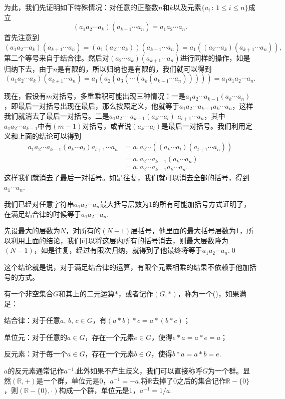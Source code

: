 为此，我们先证明如下特殊情况：对任意的正整数$n$和$k$以及元素$\{a_i\,:\, 1\leq i \leq n\}$成立
\[(a_1a_2\cdots a_{k})(a_{k+1}\cdots a_{n})=a_1a_2\cdots a_n.\]
首先注意到
\[
(a_1a_2\cdots a_{k})(a_{k+1}\cdots a_{n})=(a_1(a_2\cdots a_{k}))(a_{k+1}\cdots a_{n})=a_1((a_2\cdots a_{k})(a_{k+1}\cdots a_{n})),
\]
第二个等号来自于结合律。然后对$(a_2\cdots a_{k})(a_{k+1}\cdots a_{n})$进行同样的操作，如是归纳下去，由于$n$是有限的，所以归纳也是有限的，我们就可以得到
\[
(a_1a_2\cdots a_{k})(a_{k+1}\cdots a_{n})=a_1(a_2(a_3(\cdots (a_{k}(a_{k+1}\cdots a_{n})))))=a_1a_1a_2\cdots a_n.
\]

现在，假设有$m$对括号，多重乘积可能出现三种情况：一是$a_1a_2\cdots a_{k-1}(a_{k}\cdots a_n)$，即最后一对括号出现在最后，那么按照定义，他就等于$a_1a_2\cdots a_{k-1}a_{k}\cdots a_n$，这样我们就消去了最后一对括号。二是$a_1a_2\cdots$ $a_{k-1}(a_{k}\cdots a_l)$ $a_{l+1}\cdots a_n$，其中$a_1a_2\cdots a_{k-1}$中有$(m-1)$对括号，或者说$(a_{k}\cdots a_l)$是最后一对括号。我们利用定义和上面的结论可以得到
\begin{align*}
	a_1a_2\cdots a_{k-1}(a_{k}\cdots a_l)a_{l+1}\cdots a_n&=a_1a_2\cdots ((a_{k}\cdots a_l)(a_{l+1}\cdots a_n))\\
	&=a_1a_2\cdots a_{k-1}(a_{k}\cdots a_n)\\
	&=a_1a_2\cdots a_{k-1}a_{k}\cdots a_n.
\end{align*}
这样我们就消去了最后一对括号。如是往复，我们就可以消去全部的括号，得到$a_1\cdots a_n$.

我们已经对任意字符串$a_1a_2\cdots a_n$最大括号层数为$1$的所有可能加括号方式证明了，在满足结合律的时候等于$a_1a_2\cdots a_n$.

先设最大的层数为$N$，对所有的$(N-1)$层括号，他里面的最大括号层数为1，所以利用上面的结论，我们可以将这层内所有的括号消去，则最大层数降为$(N-1)$，如是往复，经过有限次归纳，就得到了他最终将等于$a_1a_2\cdots a_n$.\qed 

这个结论就是说，对于满足结合律的运算，有限个元素相乘的结果不依赖于他加括号的方式。

\para 有一个非空集合$G$和其上的二元运算$*$，或者记作$(G,*)$，称为一个()，如果满足：

结合律：对于任意$a$, $b$, $c\in G$，有$(a*b)*c=a*(b*c)$；

单位元：对于任意的$a\in G$，存在一个元素$e\in G$，使得$e*a=a*e=a$；

反元素：对于每一个$a\in G$，存在一个元素$b\in G$，使得$b*a=a*b=e$.

$a$的反元素通常记作$a^{-1}$.此外如果不产生歧义，我们可以直接称呼$G$为一个群。显然$(\mathbb{R},+)$是一个群，单位元是0，$a^{-1}=-a$.将$\mathbb{R}$去掉了$0$之后的集合记作$\mathbb{R}-\{0\}$，则$(\mathbb{R}-\{0\},\cdot)$构成一个群，单位元是$1$，$a^{-1}=1/a$.

